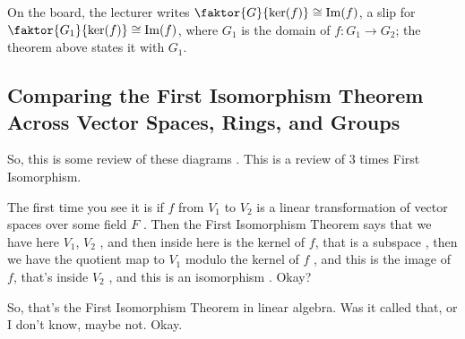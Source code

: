 
\begin{aiNote}
On the board, the lecturer writes $\faktor{G}{\ker(f)} \cong \operatorname{Im}(f)$, a slip for $\faktor{G_1}{\ker(f)} \cong \operatorname{Im}(f)$, where $G_1$ is the domain of $f \colon G_1 \to G_2$; the theorem above states it with $G_1$.
\end{aiNote}

\subsection{Comparing the First Isomorphism Theorem Across Vector Spaces, Rings, and Groups}

\begin{speech}[01:09:43 - 01:10:54]
So, this is some review of these diagrams . This is a review of $3$ times First Isomorphism.

The first time you see it is if $f$ from $V_1$ to $V_2$ is a linear transformation of vector spaces over some field $F$ . Then the First Isomorphism Theorem says that we have here $V_1$, $V_2$ , and then inside here is the kernel of $f$, that is a subspace , then we have the quotient map to $V_1$ modulo the kernel of $f$ , and this is the image of $f$, that's inside $V_2$ , and this is an isomorphism . Okay?

So, that's the First Isomorphism Theorem in linear algebra. Was it called that, or I don't know, maybe not. Okay.
\end{speech}

